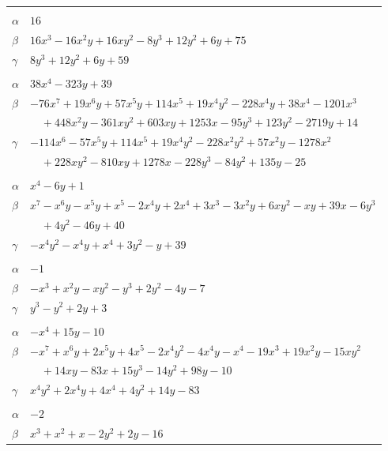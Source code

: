 \documentclass[11pt]{article}
\begin{document}
\begin{longtable}{@{}ll@{}}
\addlinespace[3pt]
\multicolumn{2}{@{}l}{$\{i,j\}=\{1,7\}$, $k_{ij}=3\cdot 5^{2}$}\\
$\alpha$ & $16$\\
$\beta$ & $16x^{3}-16x^{2}y+16xy^{2}-8y^{3}+12y^{2}+6y+75$\\
$\gamma$ & $8y^{3}+12y^{2}+6y+59$\\
\addlinespace[3pt]
\multicolumn{2}{@{}l}{$\{i,j\}=\{1,14\}$, $k_{ij}=3\cdot 13$}\\
$\alpha$ & $38x^{4}-323y+39$\\
$\beta$ & $-76x^{7}+19x^{6}y+57x^{5}y+114x^{5}+19x^{4}y^{2}-228x^{4}y+38x^{4}-1201x^{3}$\\
 & $\quad +448x^{2}y-361xy^{2}+603xy+1253x-95y^{3}+123y^{2}-2719y+14$\\
$\gamma$ & $-114x^{6}-57x^{5}y+114x^{5}+19x^{4}y^{2}-228x^{2}y^{2}+57x^{2}y-1278x^{2}$\\
 & $\quad +228xy^{2}-810xy+1278x-228y^{3}-84y^{2}+135y-25$\\
\addlinespace[3pt]
\multicolumn{2}{@{}l}{$\{i,j\}=\{1,18\}$, $k_{ij}=2^{3}\cdot 5$}\\
$\alpha$ & $x^{4}-6y+1$\\
$\beta$ & $x^{7}-x^{6}y-x^{5}y+x^{5}-2x^{4}y+2x^{4}+3x^{3}-3x^{2}y+6xy^{2}-xy+39x-6y^{3}$\\
 & $\quad +4y^{2}-46y+40$\\
$\gamma$ & $-x^{4}y^{2}-x^{4}y+x^{4}+3y^{2}-y+39$\\
\addlinespace[3pt]
\multicolumn{2}{@{}l}{$\{i,j\}=\{1,37\}$, $k_{ij}=5$}\\
$\alpha$ & $-1$\\
$\beta$ & $-x^{3}+x^{2}y-xy^{2}-y^{3}+2y^{2}-4y-7$\\
$\gamma$ & $y^{3}-y^{2}+2y+3$\\
\addlinespace[3pt]
\multicolumn{2}{@{}l}{$\{i,j\}=\{1,41\}$, $k_{ij}=2^{2}\cdot 3\cdot 13$}\\
$\alpha$ & $-x^{4}+15y-10$\\
$\beta$ & $-x^{7}+x^{6}y+2x^{5}y+4x^{5}-2x^{4}y^{2}-4x^{4}y-x^{4}-19x^{3}+19x^{2}y-15xy^{2}$\\
 & $\quad +14xy-83x+15y^{3}-14y^{2}+98y-10$\\
$\gamma$ & $x^{4}y^{2}+2x^{4}y+4x^{4}+4y^{2}+14y-83$\\
\addlinespace[3pt]
\multicolumn{2}{@{}l}{$\{i,j\}=\{2,9\}$, $k_{ij}=2^{2}\cdot 3$}\\
$\alpha$ & $-2$\\
$\beta$ & $x^{3}+x^{2}+x-2y^{2}+2y-16$\\

\end{longtable}
\end{document}
